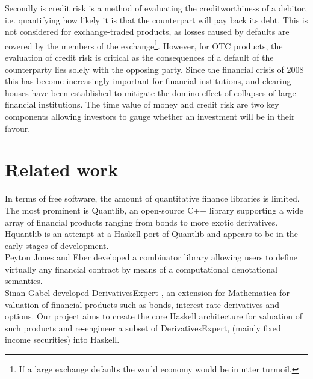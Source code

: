 Secondly is credit risk is a method of evaluating the creditworthiness of a 
debitor, i.e. quantifying how likely it is that the counterpart will pay back 
its debt. This  is not considered for exchange-traded products, as losses 
caused by defaults 
are covered by the members of the exchange\footnote{If a large exchange 
defaults the world economy would be in utter turmoil.}. However, for OTC
products, the evaluation of credit risk is critical as the consequences of a 
default of the counterparty lies solely with the opposing party. Since the 
financial crisis of 2008 this has become increasingly important for financial 
institutions, and \href{http://www.lchclearnet.com/}{clearing houses} have
been established to mitigate the 
domino effect of collapses of large financial institutions.
The time value of money and credit risk are two key components allowing 
investors to gauge whether an investment will be in their favour.\\

\section{Related work}

In terms of free software, the amount of quantitative finance libraries is 
limited.
The most prominent is Quantlib, an open-source C++ library\cite{Ame2003}
supporting a wide array of financial products ranging from bonds to more 
exotic derivatives.\\

Hquantlib\cite{hquantlib} is an attempt at a Haskell port of Quantlib
and appears to be in the early stages of development.\\

Peyton Jones and Eber\cite{composingcontracts} developed a combinator library 
allowing users to define virtually any financial contract by means of a
computational denotational semantics.
\\

Sinan Gabel developed DerivativesExpert\cite{Mathematica:DerivativesExpert}
, an extension for \href{http://www.wolfram.com/mathematica/}{Mathematica}
for valuation of financial products such as bonds, interest rate derivatives 
and options. Our project aims to create the core Haskell architecture for 
valuation of such products and re-engineer a subset of DerivativesExpert, 
(mainly fixed income securities) into Haskell.
